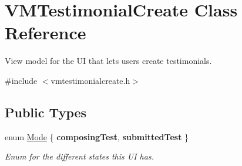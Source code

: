 \hypertarget{class_v_m_testimonial_create}{}\section{V\+M\+Testimonial\+Create Class Reference}
\label{class_v_m_testimonial_create}


View model for the UI that lets users create testimonials.  




{\ttfamily \#include $<$vmtestimonialcreate.\+h$>$}

\subsection*{Public Types}
\begin{DoxyCompactItemize}
\item 
enum \mbox{\hyperlink{class_v_m_testimonial_create_a214643dddd4f760846692f71a9958e1a}{Mode}} \{ {\bfseries composing\+Test}, 
{\bfseries submitted\+Test}
 \}
\begin{DoxyCompactList}\small\item\em Enum for the different states this UI has. \end{DoxyCompactList}\end{DoxyCompactItemize}
